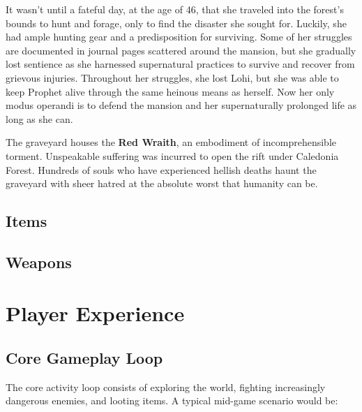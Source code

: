 \documentclass[11pt]{article}
\begin{document}
	It wasn't until a fateful day, at the age of 46, that she traveled into the forest's bounds to hunt and forage, only to find the disaster she sought for. Luckily, she had ample hunting gear and a predisposition for surviving. Some of her struggles are documented in journal pages scattered around the mansion, but she gradually lost sentience as she harnessed supernatural practices to survive and recover from grievous injuries. Throughout her struggles, she lost Lohi, but she was able to keep Prophet alive through the same heinous means as herself. Now her only modus operandi is to defend the mansion and her supernaturally prolonged life as long as she can.\newline
	
	The graveyard houses the \textbf{Red Wraith}, an embodiment of incomprehensible torment. Unspeakable suffering was incurred to open the rift under Caledonia Forest. Hundreds of souls who have experienced hellish deaths haunt the graveyard with sheer hatred at the absolute worst that humanity can be.
	
	\subsection{Items}
	
	\subsection{Weapons}
	
	\section{Player Experience}
	\subsection{Core Gameplay Loop}
	
	The core activity loop consists of exploring the world, fighting increasingly dangerous enemies, and looting items. A typical mid-game scenario would be:
	
\end{document}
